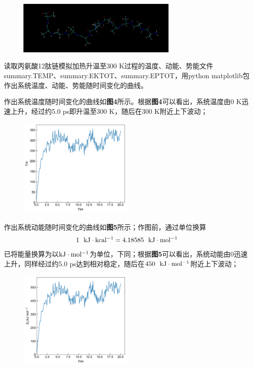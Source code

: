 \documentclass[12pt]{article}
\begin{document}
 \begin{figure}[h]
	\centering
	\includegraphics[width=0.7\textwidth]{lines.png}
\end{figure}
\par
读取丙氨酸12肽链模拟加热升温至300 K过程的温度、动能、势能文件summary.TEMP、summary.EKTOT、summary.EPTOT，用python matplotlib包作出系统温度、动能、势能随时间变化的曲线。\par
作出系统温度随时间变化的曲线如\textbf{图4}所示。根据\textbf{图4}可以看出，系统温度由0 K迅速上升，经过约5.0 ps即升温至300 K，随后在300 K附近上下波动；
\begin{figure}[h]
	\centering
	\includegraphics[width=0.5\textwidth]{temp.jpg}
\end{figure}
\par
作出系统动能随时间变化的曲线如\textbf{图5}所示；作图前，通过单位换算
$$ 1\ \ {\rm kJ \cdot kcal^{-1}}=4.18585 \ \ {\rm kJ \cdot mol^{-1}} $$
已将能量换算为以${\rm kJ \cdot mol^{-1}}$为单位，下同；根据\textbf{图5}可以看出，系统动能由0迅速上升，同样经过约5.0 ps达到相对稳定，随后在$450 \ \ {\rm kJ \cdot mol^{-1}}$附近上下波动；
\begin{figure}[h]
	\centering
	\includegraphics[width=0.5\textwidth]{ektot.jpg}
\end{figure}
\end{document}
